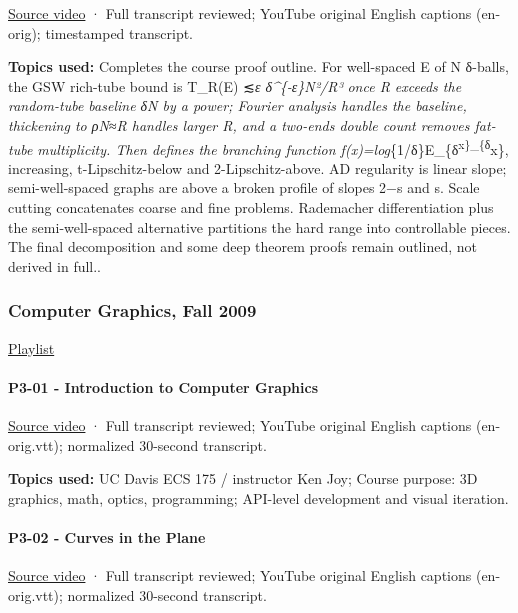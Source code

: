 \href{https://www.youtube.com/watch?v=h0Ln82BR4R0}{Source video} · Full transcript reviewed; YouTube original English captions (en-orig); timestamped transcript.

\textbf{Topics used:} Completes the course proof outline. For well-spaced E of N δ-balls, the GSW rich-tube bound is \textbar T\_R(E)\textbar{} ≲\emph{ε δ\^{}\{-ε\}N²/R³ once R exceeds the random-tube baseline δN by a power; Fourier analysis handles the baseline, thickening to ρN≈R handles larger R, and a two-ends double count removes fat-tube multiplicity. Then defines the branching function f(x)=log}\{1/δ\}\textbar E\_\{δ\textsuperscript{x\}\textbar\_\{δ}x\}, increasing, t-Lipschitz-below and 2-Lipschitz-above. AD regularity is linear slope; semi-well-spaced graphs are above a broken profile of slopes 2−s and s. Scale cutting concatenates coarse and fine problems. Rademacher differentiation plus the semi-well-spaced alternative partitions the hard range into controllable pieces. The final decomposition and some deep theorem proofs remain outlined, not derived in full..

\subsubsection{Computer Graphics, Fall 2009}\label{computer-graphics-fall-2009}

\href{https://www.youtube.com/playlist?list=PL_w_qWAQZtAZhtzPI5pkAtcUVgmzdAP8g}{Playlist}

\paragraph{P3-01 - Introduction to Computer Graphics}\label{p3-01---introduction-to-computer-graphics}

\href{https://www.youtube.com/watch?v=01YSK5gIEYQ}{Source video} · Full transcript reviewed; YouTube original English captions (en-orig.vtt); normalized 30-second transcript.

\textbf{Topics used:} UC Davis ECS 175 / instructor Ken Joy; Course purpose: 3D graphics, math, optics, programming; API-level development and visual iteration.

\paragraph{P3-02 - Curves in the Plane}\label{p3-02---curves-in-the-plane}

\href{https://www.youtube.com/watch?v=0NbD-c0Ctdk}{Source video} · Full transcript reviewed; YouTube original English captions (en-orig.vtt); normalized 30-second transcript.

